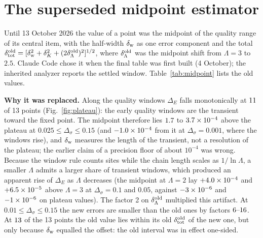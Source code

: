\documentclass[10pt,a4paper]{article}
\newcommand{\Ds}{\Delta_\sigma}
\newcommand{\DE}{\Delta_E}
\newcommand{\dK}{\delta_K}
\newcommand{\dtot}{\delta_{\rm tot}}
\begin{document}
\section{The superseded midpoint estimator}\label{app:midpoint}
Until 13 October 2026 the value of a point was the midpoint of the quality range of its central item, with the half-width $\delta_{\rm
w}$ as one error component and the total $\dtot^{\rm old}=[\delta_{\rm w}^2+\dK^2+(2\delta^{\rm old}_\Lambda)^2]^{1/2}$, where
$\delta^{\rm old}_\Lambda$ was the midpoint shift from $\Lambda=3$ to $2.5$. Claude Code chose it when the final table was first built
(4 October); the inherited analyzer reports the settled window. Table~\ref{tab:midpoint} lists the old values.

\textbf{Why it was replaced.} Along the quality windows $\DE$ falls monotonically at $11$ of 13 points (Fig.~\ref{fig:plateau}): the
early quality windows are the transient toward the fixed point. The midpoint therefore lies $1.7$ to $3.7\times10^{-4}$
above the plateau at $0.025\le\Ds\le0.15$ (and $-1.0\times10^{-4}$ from it at $\Ds=0.001$, where the windows rise), and $\delta_{\rm w}$
measures the length of the transient, not a resolution of the plateau; the earlier claim of a precision floor of about $10^{-4}$ was
wrong. Because the window rule counts sites while the chain length scales as $1/\ln\Lambda$, a smaller $\Lambda$ admits a larger share
of transient windows, which produced an apparent rise of $\DE$ as $\Lambda$ decreases (the midpoint at $\Lambda=2$ lay
$+4.0\times10^{-4}$ and $+6.5\times10^{-5}$ above $\Lambda=3$ at $\Ds=0.1$ and $0.05$, against $-3\times10^{-6}$ and $-1\times10^{-6}$
on plateau values). The factor 2 on $\delta^{\rm old}_\Lambda$ multiplied this artifact. At $0.01\le\Ds\le0.15$ the new errors are
smaller than the old ones by factors $6\text{--}16$. At $13$ of the 13 points the old value lies within its old
$\dtot^{\rm old}$ of the new one, but only because $\delta_{\rm w}$ equalled the offset: the old interval was in effect one-sided.

\begin{table}[ht]\centering\scriptsize\setlength{\tabcolsep}{4pt}
\caption{The superseded estimator. Old value: quality-range midpoint with $\dtot^{\rm old}$ (two significant digits, as given in the
earlier version of this note); the half-width $\delta_{\rm w}$ and $2|\delta^{\rm old}_\Lambda|$ in units of $10^{-4}$; the value of
this note; the difference; the old status labels: (a) far above the $\varepsilon$ series compared with the old error, attributed to a
truncation bias of bosonic NRG, not used; (b) above the Borel--Pad\'e sum by about the old error, same attribution, not used; (c) at
$\Ds=0.2$, the series cannot test the point at the $10^{-3}$ level. The attribution to a truncation bias has since been withdrawn
(Sec.~\ref{sec:series}).}\label{tab:midpoint}

\end{table}
\end{document}
